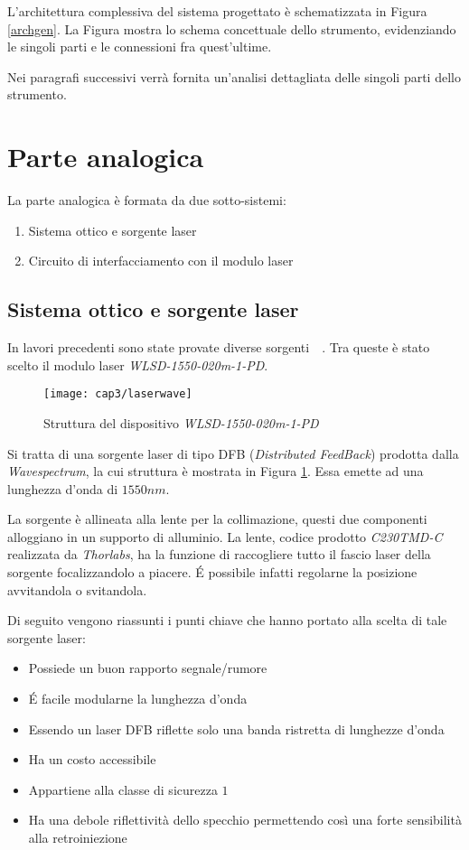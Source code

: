 L'architettura complessiva del sistema progettato è schematizzata in Figura \ref{archgen}. La Figura mostra lo schema concettuale dello strumento, evidenziando le singoli parti e le connessioni fra quest'ultime.

Nei paragrafi successivi verrà fornita un'analisi dettagliata delle singoli parti dello strumento.

\section{Parte analogica}
La parte analogica è formata da due sotto-sistemi:
\begin{enumerate}
	\item Sistema ottico e sorgente laser
	\item Circuito di interfacciamento con il modulo laser
\end{enumerate}

\subsection{Sistema ottico e sorgente laser}
In lavori precedenti sono state provate diverse sorgenti~\cite{thesispallsilv}~\cite{thesisstorti}. Tra queste è stato scelto il modulo laser \textit{WLSD-1550-020m-1-PD}.
\begin{figure}  
  \begin{center}
    \texttt{[image: cap3/laserwave]}
    \caption{Struttura del dispositivo \textit{WLSD-1550-020m-1-PD}}
    \label{laserwave}
  \end{center}
\end{figure}

Si tratta di una sorgente laser di tipo DFB (\textit{Distributed FeedBack}) prodotta dalla \textit{Wavespectrum}, la cui struttura è mostrata in Figura \ref{laserwave}. Essa emette ad una lunghezza d'onda di $1550nm$.

La sorgente è allineata alla lente per la collimazione, questi due componenti alloggiano in un supporto di alluminio. La lente, codice prodotto \textit{C230TMD-C} realizzata da \textit{Thorlabs}, ha la funzione di raccogliere tutto il fascio laser della sorgente focalizzandolo a piacere. \'E possibile infatti regolarne la posizione avvitandola o svitandola.

Di seguito vengono riassunti i punti chiave che hanno portato alla scelta di tale sorgente laser:
\begin{itemize}
	\item Possiede un buon rapporto segnale/rumore
	\item \'E facile modularne la lunghezza d'onda
	\item Essendo un laser DFB riflette solo una banda ristretta di lunghezze d'onda
	\item Ha un costo accessibile
	\item Appartiene alla classe di sicurezza $1$
	\item Ha una debole riflettività dello specchio permettendo così una forte sensibilità alla retroiniezione
\end{itemize}

